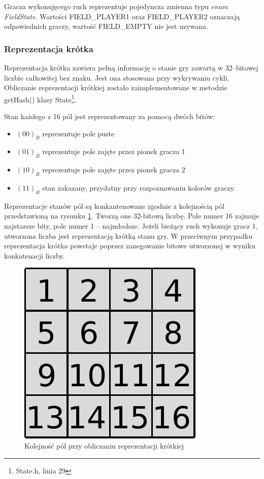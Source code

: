 \documentclass{scrartcl}
\begin{document}
Gracza wykonujęcego ruch reprezentuje pojedyncza zmienna typu
\emph{enum FieldState}. Wartości FIELD\_PLAYER1 oraz FIELD\_PLAYER2 
oznaczają odpowiednich graczy, wartość FIELD\_EMPTY nie jest
uzywana.

\subsubsection{Reprezentacja krótka}

Reprezentacja krótka zawiera pełną informację o stanie gry zawartą
w 32--bitowej liczbie całkowitej bez znaku. Jest ona stosowana przy
wykrywaniu cykli. Obliczanie reprezentacji krótkiej zostało
zaimplementowane w metodzie getHash() klasy State\footnote{
State.h, linia 29}.

Stan każdego z 16 pól jest reprezentowany za pomocą dwóch
bitów:
\begin{itemize}
\item $(00)_B$ reprezentuje pole puste
\item $(01)_B$ reprezentuje pole zajęte przez pionek gracza 1
\item $(10)_B$ reprezentuje pole zajęte przez pionek gracza 2
\item $(11)_B$ stan zakazany, przydatny przy rozpoznawaniu kolorów
  graczy.
\end{itemize}

Reprezentacje stanów pól są konkantenowane zgodnie z kolejnością pól
przedstawioną na rysunku \ref{fig:field_order}. Tworzą one 32-bitową
liczbę. Pole numer 16 zajmuje najstarsze bity, pole numer 1 --
najmłodsze. Jeżeli bieżący ruch wykonuje gracz 1,
utworzona liczba jest reprezentacją krótką stanu gry. W przeciwnym
przypadku reprezentacja krótka powstaje 
poprzez zanegowanie bitowe utworzonej w wyniku konkatenacji liczby.

\begin{figure}[h]
  \centering
  \includegraphics{data/field_order.pdf}
  \caption{Kolejność pól przy obliczaniu reprezentacji krótkiej}
  \label{fig:field_order}
\end{figure}
\end{document}
